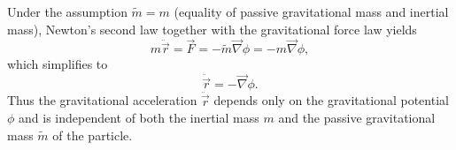 Under the assumption $\tilde{m} = m$ (equality of passive gravitational mass and inertial mass), Newton's second law together with the gravitational force law yields
$$m\ddot{\vec{r}} = \vec{F} = -\tilde{m}\vec{\nabla}\phi = -m\vec{\nabla}\phi,$$
which simplifies to
$$\ddot{\vec{r}} = -\vec{\nabla}\phi.$$
Thus the gravitational acceleration $\ddot{\vec{r}}$ depends only on the gravitational potential $\phi$ and is independent of both the inertial mass $m$ and the passive gravitational mass $\tilde{m}$ of the particle.
